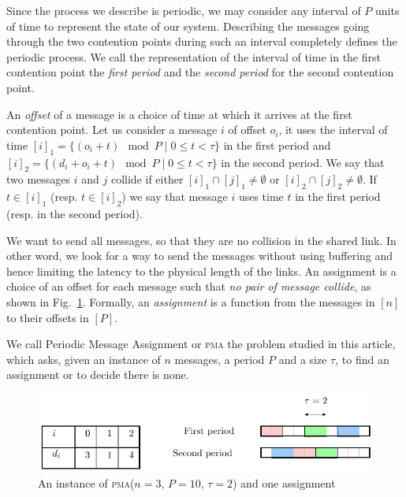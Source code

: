 \documentclass[10pt, conference, letterpaper]{algotel}
\newcommand\pma{\textsc{pma}\xspace}
\begin{document}
Since the process we describe is periodic, we may consider any interval of $P$ units of time
to represent the state of our system. Describing the messages going through the two contention points during such an interval completely defines the periodic process. We call the representation of the interval of time in the first contention point the \emph{first period} and the \emph{second period} for the second contention point.

An \emph{offset} of a message is a choice of time at which it arrives
at the first contention point. Let us consider a message $i$
of offset $o_i$, it uses the interval of time $[i]_1 = \{ (o_i + t) \mod P \mid 0 \leq t < \tau \}$ in the first period and $[i]_2 = \{ (d_i + o_i + t) \mod P \mid 0 \leq t < \tau \}$ in the second period. We say that two messages $i$ and $j$ collide if either $[i]_1 \cap [j]_1 \neq \emptyset $ or $[i]_2 \cap [j]_2 \neq \emptyset $. If $t \in [i]_1$ (resp. $t \in [i]_2$) we say that message $i$ uses time $t$ in the first period (resp. in the second period).

We want to send all messages, so that they are no collision in the shared link.
In other word, we look for a way to send the messages without using buffering and 
hence limiting the latency to the physical length of the links. An assignment is a
choice of an offset for each message such that \emph{no pair of message collide}, as shown in Fig.~\ref{fig:assignment}. Formally, an \emph{assignment} is a function from the messages in $[n]$ to their offsets in $[P]$.  

We call Periodic Message Assignment or \pma the problem studied in this article,
which asks, given an instance of $n$ messages, a period $P$ and a size $\tau$, to find 
an assignment or to decide there is none.
\begin{figure}
\begin{center}
\includegraphics[scale=0.7]{instance}
\end{center}
\caption{An instance of \pma ($n=3$, $P= 10$, $\tau = 2$) and one assignment}
\label{fig:assignment}
\end{figure}
\end{document}
